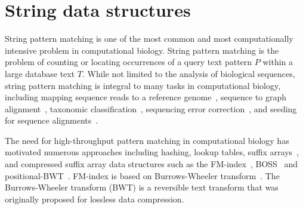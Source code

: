 \section{String data structures}

%
String pattern matching is one of the most common and most computationally intensive problem in computational biology.
%
String pattern matching is the problem of counting or locating occurrences of a query text pattern $P$ within a large database text $T$. While not limited to the analysis of biological sequences, string pattern matching is integral to many tasks in computational biology, including mapping sequence reads to a reference genome~\cite{li2009fast,langmead2009ultrafast}, sequence to graph alignment~\cite{Jain2020}, taxonomic classification~\cite{menzel2016fast,kim2016centrifuge}, sequencing error correction~\cite{huang2017efficient}, and seeding for sequence alignments~\cite{buchfink2015fast,altschul1990basic,steinegger2017mmseqs2}.

The need for high-throughput pattern matching in computational biology has motivated numerous approaches including hashing, lookup tables, suffix arrays~\cite{manber1993suffix}, and compressed suffix array data structures such as the FM-index~\cite{ferragina2000opportunistic}, BOSS~\cite{Muggli2019} and positional-BWT~\cite{Durbin2014}. 
FM-index is based on Burrows-Wheeler transform~\cite{burrows1994block}. The Burrows-Wheeler transform (BWT) is a reversible text transform that was originally proposed for lossless data compression.



